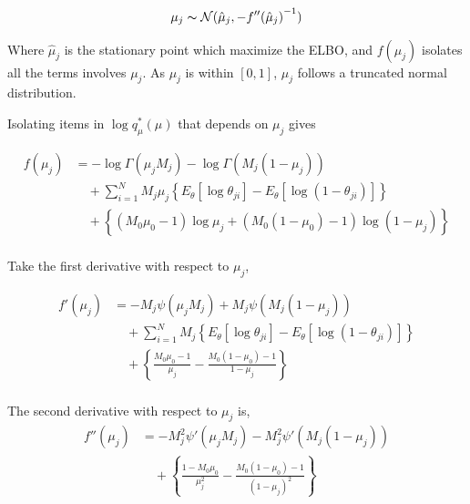 \documentclass[11pt,reqno]{amsart}
\begin{document}
\begin{align}
\mu_j \thicksim \mathcal{N}(\hat{\mu}_j, {-f''(\hat{\mu}_j ) }^{-1})
\end{align}

Where $ \hat{\mu}_j $ is the stationary point which maximize the ELBO, and $ f(\mu_j) $ isolates all the terms involves $ \mu_j $. As $ \mu_j $ is within $ [0,1] $, $ \mu_j $ follows a truncated normal distribution.

Isolating items in $ \log q_\mu^*(\mu) $ that depends on $ \mu_j $ gives

\begin{equation}
\begin{split}
f(\mu_j)
&= - \log \Gamma(\mu_j M_j) - \log \Gamma(M_j (1-\mu_j))\\
&\quad + \sum_{i=1}^{N} M_j\mu_j \left\lbrace   E_\theta  \left[ \log \theta_{ji}\right] - E_\theta  \left[ \log \left( 1- \theta_{ji}\right) \right] \right\rbrace \\
&\quad + \left\lbrace (M_0 \mu_0 - 1) \log \mu_j + (M_0 ( 1 - \mu_0) - 1) \log ( 1 - \mu_j)\right\rbrace \\
\end{split}
\end{equation}

Take the first derivative with respect to $ \mu_j $,

\begin{equation}
\label{f''(mu)}
\begin{split}
f'(\mu_j) &= -M_j\psi (\mu_j M_j) + M_j \psi (M_j(1-\mu_j))\\
&\quad + \sum_{i=1}^{N} M_j \left\lbrace   E_\theta  \left[ \log \theta_{ji}\right] - E_\theta  \left[ \log \left( 1- \theta_{ji}\right) \right] \right\rbrace\\
&\quad + \left\lbrace \frac{M_0 \mu_0 - 1}{\mu_j} - \frac{M_0 ( 1 - \mu_0) - 1}{ 1 - \mu_j} \right\rbrace \\
\end{split}
\end{equation}

The second derivative with respect to $ \mu_j $ is,
\begin{equation}
\begin{split}
f''(\mu_j)&= -M_j^2\psi' (\mu_j M_j) - M_j^2 \psi' (M_j(1-\mu_j))\\
&\quad + \left\lbrace \frac{1 - M_0 \mu_0}{\mu_j^2} - \frac{M_0 ( 1 - \mu_0) - 1}{ (1 - \mu_j)^2} \right\rbrace \\
\end{split}
\end{equation}
\end{document}

